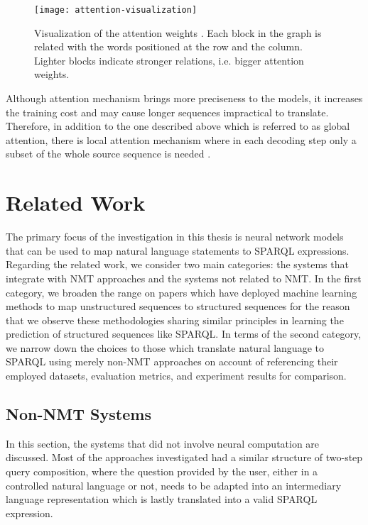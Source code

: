\begin{figure}[h]
\texttt{[image: attention-visualization]}
\centering
\caption{Visualization of the attention weights \cite{Luong2015}. Each block in the graph is related with the words positioned at the row and the column. Lighter blocks indicate stronger relations, i.e. bigger attention weights.}
\label{figure:attention visualization}
\end{figure}

Although attention mechanism brings more preciseness to the models, it increases the training cost and may cause longer sequences impractical to translate. Therefore, in addition to the one described above which is referred to as global attention, there is local attention mechanism where in each decoding step only a subset of the whole source sequence is needed \cite{Luong2015}.

\section{Related Work} \label{section:related work}

The primary focus of the investigation in this thesis is neural network models that can be used to map natural language statements to SPARQL expressions. Regarding the related work, we consider two main categories: the systems that integrate with NMT approaches and the systems not related to NMT. In the first category, we broaden the range on papers which have deployed machine learning methods to map unstructured sequences to structured sequences for the reason that we observe these methodologies sharing similar principles in learning the prediction of structured sequences like SPARQL. In terms of the second category, we narrow down the choices to those which translate natural language to SPARQL using merely non-NMT approaches on account of referencing their employed datasets, evaluation metrics, and experiment results for comparison. 

\subsection{Non-NMT Systems} \label{subsection: non-nmt related work}

In this section, the systems that did not involve neural computation are discussed. Most of the approaches investigated had a similar structure of two-step query composition, where the question provided by the user, either in a controlled natural language or not, needs to be adapted into an intermediary language representation which is lastly translated into a valid SPARQL expression.

